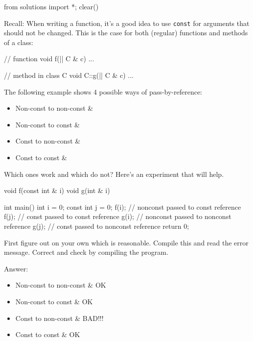\begin{python0}
from solutions import *; clear()
\end{python0}

Recall: When writing a function, it's a good idea to use \texttt{const}
for arguments that should not be changed. This is the case for both
(regular) functions and methods of a class:

\begin{consolethree}[escapeinside=||]
// function
void f(|| C & c) { ... }

// method in class C
void C::g(|| C & c) { ... }
\end{consolethree}

The following example shows 4 possible ways of pass-by-reference:

\begin{itemize}
\item Non-const to non-const \&
\item Non-const to const \&
\item Const to non-const \&
\item Const to const \&
\end{itemize}

Which ones work and which do not? Here's an experiment
that will help.

\begin{consolethree}[escapeinside=||]
void f(const int & i) {}
void g(int & i) {}

int main()
{
    int i = 0;
    const int j = 0;
    f(i); // nonconst passed to const reference
    f(j); // const passed to const reference
    g(i); // nonconst passed to nonconst reference
    g(j); // const passed to nonconst reference
    return 0;
}
\end{consolethree}

First figure out on your own which is reasonable. Compile this and read
the error message. Correct and check by compiling the program.

Answer:

\begin{itemize}
\item Non-const to non-const \&         OK
\item Non-const to const \&             OK
\item Const to non-const \&             BAD!!!
\item Const to const \&                 OK
\end{itemize}

